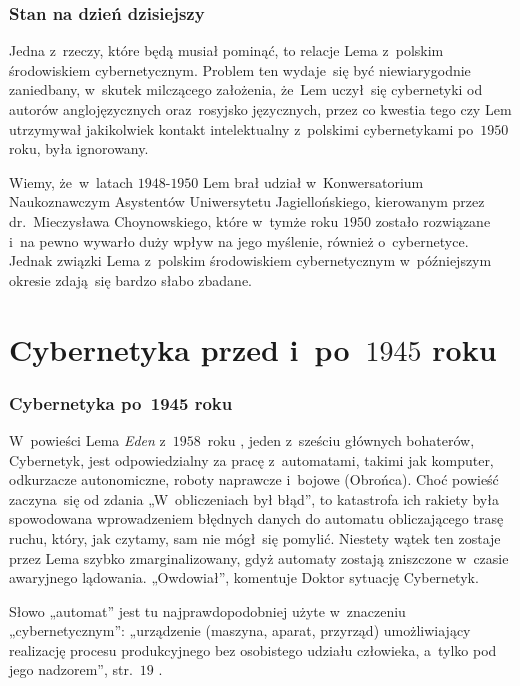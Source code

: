 \documentclass[10pt,t]{beamer}
\begin{document}
\begin{frame}
  \frametitle{Stan na dzień dzisiejszy}


  Jedna z~rzeczy, które będą musiał pominąć, to relacje Lema z~polskim
  środowiskiem cybernetycznym. Problem ten wydaje~się być niewiarygodnie
  zaniedbany, w~skutek milczącego założenia, że~Lem uczył~się cybernetyki
  od autorów anglojęzycznych oraz~rosyjsko języcznych, przez co kwestia
  tego czy Lem utrzymywał jakikolwiek kontakt intelektualny z~polskimi
  cybernetykami po~$1950$ roku, była ignorowany.

  Wiemy, że~w~latach $1948\text{-}1950$ Lem brał udział w~Konwersatorium
  Naukoznawczym Asystentów Uniwersytetu Jagiellońskiego, kierowanym
  przez
  {dr.~Mieczysława Choynowskiego}, które w~tymże roku $1950$ zostało
  rozwiązane i~na pewno wywarło duży wpływ na jego myślenie,
  również o~cybernetyce. Jednak związki Lema z~polskim środowiskiem
  cybernetycznym w~późniejszym okresie zdają~się bardzo słabo zbadane.

\end{frame}









\section{Cybernetyka przed i~po~$1945$ roku}


\begin{frame}
  \frametitle{Cybernetyka po~1945 roku}


  W~powieści Lema \textit{Eden} z~$1958$~roku
  \parencite{Lem-Eden-Pub-2019}, jeden z~sześciu głównych
  bohaterów, Cybernetyk, jest odpowiedzialny za pracę z~automatami, takimi
  jak komputer, odkurzacze autonomiczne, roboty naprawcze i~bojowe
  (Obrońca). Choć powieść zaczyna~się od zdania „W~obliczeniach był błąd”,
  to katastrofa ich rakiety była spowodowana wprowadzeniem błędnych danych
  do automatu obliczającego trasę ruchu, który, jak czytamy, sam nie
  mógł~się pomylić.
  Niestety wątek ten zostaje przez Lema szybko zmarginalizowany, gdyż
  automaty zostają zniszczone w~czasie awaryjnego lądowania. „Owdowiał”,
  komentuje Doktor sytuację Cybernetyk.

  Słowo „automat” jest tu najprawdopodobniej użyte w~znaczeniu
  „cybernetycznym”: „urządzenie (maszyna, aparat, przyrząd)
  umożliwiający realizację procesu produkcyjnego bez osobistego udziału
  człowieka, a~tylko pod jego nadzorem”, str.~$19$ \parencite{}.

\end{frame}
\end{document}
